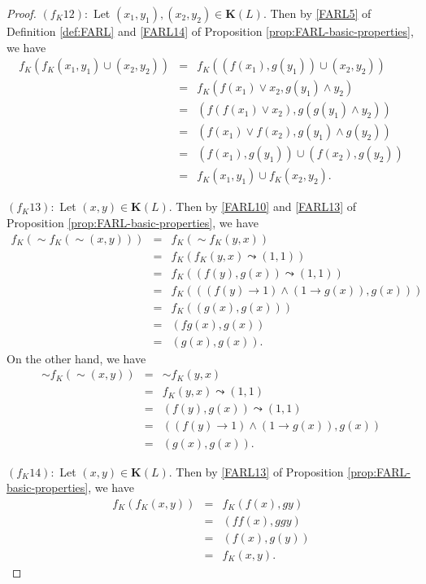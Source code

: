 \documentclass[final,12pt,times]{elsarticle}
\theoremstyle{plain}
\theoremstyle{definition}
\theoremstyle{break}
\begin{document}
\begin{proof}
$(f_K12)$:\ Let $(x_1,y_1),(x_2,y_2)\in \mathbf{K}(L)$. Then by \eqref{FARL5} of Definition \ref{def:FARL} and \eqref{FARL14} of Proposition \ref{prop:FARL-basic-properties}, we have
\begin{eqnarray*}
f_K(f_K(x_1,y_1)\cup (x_2,y_2))&=&f_K((f(x_1),g(y_1))\cup (x_2,y_2))\\&=&f_K(f(x_1)\vee x_2,g(y_1)\wedge y_2)\\&=&(f(f(x_1)\vee x_2),g(g(y_1)\wedge y_2))\\&=&(f(x_1)\vee f(x_2),g(y_1)\wedge g(y_2))\\&=&(f(x_1),g(y_1))\cup (f(x_2),g(y_2))\\&=&f_K(x_1,y_1)\cup f_K(x_2,y_2).
\end{eqnarray*}


$(f_K13)$:\ Let $(x,y)\in \mathbf{K}(L)$. Then by \ref{FARL10} and \ref{FARL13} of Proposition \ref{prop:FARL-basic-properties}, we have
\begin{eqnarray*}
               f_K({\sim}f_K({\sim}(x,y)))&=& f_K({\sim}f_K(y,x))\\&=& f_K(f_K(y,x)\leadsto(1,1))\\&=&f_K((f(y),g(x))\leadsto (1,1))\\&=&f_K(((f(y)\rightarrow 1)\wedge (1\rightarrow g(x)),g(x)))\\&=&f_K((g(x),g(x)))\\&=&(fg(x), g(x))\\&=&(g (x), g(x)).
               \end{eqnarray*}
On the other hand, we have
\begin{eqnarray*}
               {\sim}f_K({\sim}(x,y))&=& {\sim}f_K(y,x)\\&=& f_K(y,x)\leadsto(1,1)\\&=&(f(y),g(x))\leadsto (1,1)\\&=&((f (y)\rightarrow 1)\wedge (1\rightarrow g (x)),g (x))\\&=&(g (x),g (x)).
               \end{eqnarray*}
               
$(f_K14)$:\ Let $(x,y)\in \mathbf{K}(L)$. Then by \ref{FARL13} of Proposition \ref{prop:FARL-basic-properties}, we have
\begin{eqnarray*}
f_K(f_K(x,y))&=&f_K(f (x), g y)\\&=& (ff (x),g g y)\\&=&(f (x),g(y))\\&=& f_K(x,y).
\end{eqnarray*}


\end{proof}
\end{document}
